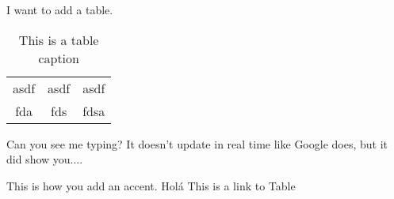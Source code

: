 
I want to add a table.
\begin{table} 
    \begin{tabular}{ c c c }
        asdf & asdf & asdf \\ 
        fda & fds & fdsa \\ 
    \end{tabular} 
    \caption{This is a table caption} 
\end{table}

Can you see me typing? It doesn't update in real time like Google does, but it did show you....

This is how you add an accent. Holá
This is a link to Table
